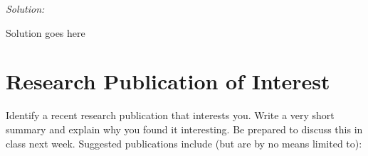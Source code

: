\documentclass[11pt]{article}
\newenvironment{solution}{
	\vspace{10px}\noindent\emph{Solution:}
}{
	\vspace{10px}
}
\begin{document}
\begin{solution}
	Solution goes here
\end{solution}  


\section*{Research Publication of Interest} Identify a recent research publication that interests you. Write a very short summary and explain why you found it interesting. Be prepared to discuss this in class next week. Suggested publications include (but are by no means limited to): 

\vspace{11px}
\end{document}
